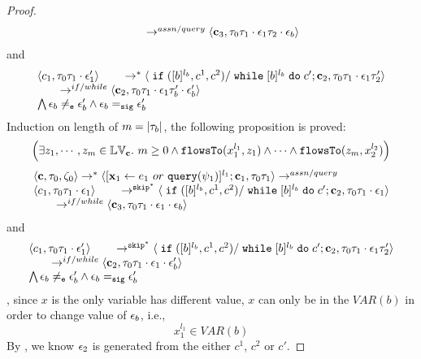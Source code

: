 \begin{proof}
\[\begin{array}{l}
  \qquad \rightarrow^{assn/query} 
  \langle {\boldsymbol{\mathbf{c}}}_3,  \mathtt{\tau}_0 \mathtt{\tau}_1 \cdot \mathtt{\epsilon}_1 \mathtt{\tau}_2 \cdot \mathtt{\epsilon}_b \rangle 
\end{array}
 \]
and 
 \[
  \begin{array}{l}   
 \langle c_1, \mathtt{\tau}_0 \mathtt{\tau}_1 \cdot \mathtt{\epsilon}_1' \rangle 
  \qquad \rightarrow^{*} 
  \langle \;\mathtt{if}\;([b]{}^{l_b}, c^1, c^2) / \;\mathtt{while}\; [b]{}^{l_b} \;\mathtt{do}\; c'; {\boldsymbol{\mathbf{c}}}_2, 
  \mathtt{\tau}_0 \mathtt{\tau}_1 \cdot \mathtt{\epsilon}_1 \mathtt{\tau}_2' \rangle 
  \\
  \qquad \rightarrow^{if/while} 
  \langle {\boldsymbol{\mathbf{c}}}_2,  \mathtt{\tau}_0 \mathtt{\tau}_1 \cdot \mathtt{\epsilon}_1 \mathtt{\tau}_b' \cdot \mathtt{\epsilon}_b' \rangle 
\\
\bigwedge
\mathtt{\epsilon}_b \neq_{\mathtt{e}} \mathtt{\epsilon}_b' \land \mathtt{\epsilon}_b =_{\mathtt{sig}} \mathtt{\epsilon}_b'
\end{array}
 \]
Induction on length of $m = |\mathtt{\tau}_b|$, the following proposition is proved:
%
 \[
 \Big( \exists z_1, \cdots, z_m \in \mathbb{LV}_{{\boldsymbol{\mathbf{c}}}}. ~ m \geq 0 \land
  \mathtt{flowsTo}(x_1^{l_1}, z_1) 
  \land \cdots \land \mathtt{flowsTo}(z_m, x_2^{l_2}) \Big)
  \]
\[
  \begin{array}{l}   
\langle {\boldsymbol{\mathbf{c}}}, \mathtt{\tau}_0, \mathtt{\zeta}_0 \rangle \rightarrow^{*} 
\langle [\mathrel{ {\boldsymbol{\mathbf{x}}}_1 \leftarrow e_1~ or ~ {\tt query}(\psi_1) }]^{l_1} ; {\boldsymbol{\mathbf{c}}}_1, \mathtt{\tau}_0 \mathtt{\tau}_1 \rangle  \rightarrow^{assn/query}
\\ 
 \langle c_1, \mathtt{\tau}_0 \mathtt{\tau}_1 \cdot \mathtt{\epsilon}_1 \rangle 
  \qquad \rightarrow^{\mathtt{skip}^*} 
  \langle \;\mathtt{if}\;([b]{}^{l_b}, c^1, c^2) / \;\mathtt{while}\; [b]{}^{l_b} \;\mathtt{do}\; c'; {\boldsymbol{\mathbf{c}}}_2, 
  \mathtt{\tau}_0 \mathtt{\tau}_1 \cdot \mathtt{\epsilon}_1 \rangle 
  \\
  \qquad \rightarrow^{if/while} 
  \langle {\boldsymbol{\mathbf{c}}}_3,  \mathtt{\tau}_0 \mathtt{\tau}_1 \cdot \mathtt{\epsilon}_1 \cdot \mathtt{\epsilon}_b \rangle 
\end{array}
 \]
and 
 \[
  \begin{array}{l}   
 \langle c_1, \mathtt{\tau}_0 \mathtt{\tau}_1 \cdot \mathtt{\epsilon}_1' \rangle 
  \qquad \rightarrow^{\mathtt{skip}^*} 
  \langle \;\mathtt{if}\;([b]{}^{l_b}, c^1, c^2) / \;\mathtt{while}\; [b]{}^{l_b} \;\mathtt{do}\; c'; {\boldsymbol{\mathbf{c}}}_2, 
  \mathtt{\tau}_0 \mathtt{\tau}_1 \cdot \mathtt{\epsilon}_1 \mathtt{\tau}_2' \rangle 
  \\
  \qquad \rightarrow^{if/while} 
  \langle {\boldsymbol{\mathbf{c}}}_2,  \mathtt{\tau}_0 \mathtt{\tau}_1 \cdot \mathtt{\epsilon}_1 \cdot \mathtt{\epsilon}_b' \rangle 
\\
\bigwedge
\mathtt{\epsilon}_b \neq_{\mathtt{e}} \mathtt{\epsilon}_b' \land \mathtt{\epsilon}_b =_{\mathtt{sig}} \mathtt{\epsilon}_b'
\end{array}
 \]
 , since $x$ is the only variable has different value, $x$ can only be in the $VAR(b)$ in order to change value of $\mathtt{\epsilon}_b$, i.e.,
 \[
 x_1^{l_1} \in VAR(b)
 \]
 By , we know $\mathtt{\epsilon}_2$ is generated from the either $c^1$, $c^2$ or $c'$.

\end{proof}
